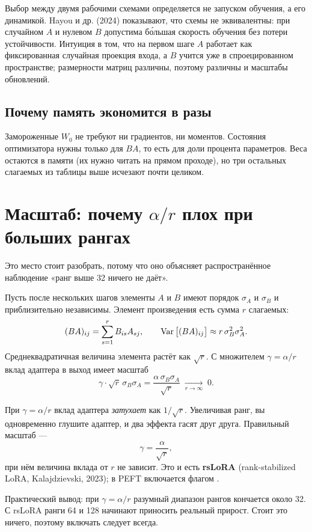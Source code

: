 \documentclass[11pt,a4paper]{article}
\begin{document}
Выбор между двумя рабочими схемами определяется не запуском обучения,
а его динамикой. Hayou и др. (2024) показывают, что схемы не
эквивалентны: при случайном $A$ и нулевом $B$ допустима бо́льшая
скорость обучения без потери устойчивости. Интуиция в том, что на
первом шаге $A$ работает как фиксированная случайная проекция входа,
а $B$ учится уже в спроецированном пространстве; размерности матриц
различны, поэтому различны и масштабы обновлений.

\subsection{Почему память экономится в разы}

Замороженные $W_0$ не требуют ни градиентов, ни моментов. Состояния
оптимизатора нужны только для $BA$, то есть для доли процента
параметров. Веса остаются в памяти (их нужно читать на прямом проходе),
но три остальных слагаемых из таблицы выше исчезают почти целиком.

\section{Масштаб: почему \texorpdfstring{$\alpha/r$}{alpha/r} плох при больших рангах}

Это место стоит разобрать, потому что оно объясняет распространённое
наблюдение «ранг выше 32 ничего не даёт».

Пусть после нескольких шагов элементы $A$ и $B$ имеют порядок
$\sigma_A$ и $\sigma_B$ и приблизительно независимы. Элемент
произведения есть сумма $r$ слагаемых:
\[
(BA)_{ij} = \sum_{s=1}^{r} B_{is} A_{sj},
\qquad
\operatorname{Var}\big[(BA)_{ij}\big] \approx r\,\sigma_B^2 \sigma_A^2 .
\]
Среднеквадратичная величина элемента растёт как $\sqrt{r}$. С множителем
$\gamma = \alpha/r$ вклад адаптера в выход имеет масштаб
\[
\gamma \cdot \sqrt{r}\,\sigma_B\sigma_A
= \frac{\alpha\,\sigma_B\sigma_A}{\sqrt{r}} \;\xrightarrow[r\to\infty]{}\; 0 .
\]

\begin{keybox}
При $\gamma=\alpha/r$ вклад адаптера \emph{затухает} как $1/\sqrt{r}$.
Увеличивая ранг, вы одновременно глушите адаптер, и два эффекта гасят
друг друга. Правильный масштаб —
\[
\gamma = \frac{\alpha}{\sqrt{r}},
\]
при нём величина вклада от $r$ не зависит. Это и есть \textbf{rsLoRA}
(rank-stabilized LoRA, Kalajdzievski, 2023); в PEFT включается флагом
.
\end{keybox}

Практический вывод: при $\gamma=\alpha/r$ разумный диапазон рангов
кончается около 32. С rsLoRA ранги 64 и 128 начинают приносить реальный
прирост. Стоит это ничего, поэтому включать следует всегда.
\end{document}
